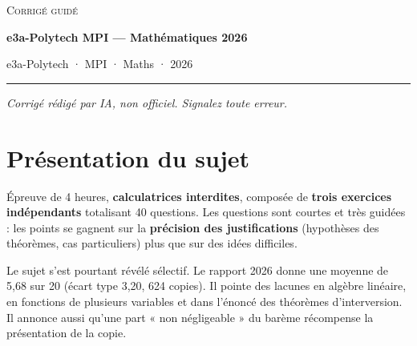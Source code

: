 \documentclass[11pt,a4paper]{article}
\begin{document}
\thispagestyle{plain}
\begin{center}
  {\small\scshape Corrigé guidé}\par\smallskip
  {\LARGE\bfseries e3a-Polytech MPI — Mathématiques 2026\par}\medskip
  {\large e3a-Polytech · MPI · Maths · 2026\par}
\end{center}
\vspace{2pt}\hrule\vspace{8pt}

\emph{Corrigé rédigé par IA, non officiel. Signalez toute erreur.}

\hypertarget{pruxe9sentation-du-sujet}{%
\section{Présentation du sujet}\label{pruxe9sentation-du-sujet}}

Épreuve de 4 heures, \textbf{calculatrices interdites}, composée de \textbf{trois exercices indépendants} totalisant 40 questions. Les questions sont courtes et très guidées : les points se gagnent sur la \textbf{précision des justifications} (hypothèses des théorèmes, cas particuliers) plus que sur des idées difficiles.

Le sujet s'est pourtant révélé sélectif. Le rapport 2026 donne une moyenne de 5,68 sur 20 (écart type 3,20, 624 copies). Il pointe des lacunes en algèbre linéaire, en fonctions de plusieurs variables et dans l'énoncé des théorèmes d'interversion. Il annonce aussi qu'une part « non négligeable » du barème récompense la présentation de la copie.
\end{document}
